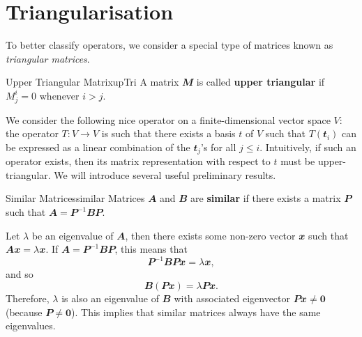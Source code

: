 \documentclass[math, code]{amznotes}
\theoremstyle{remark}
\newcommand{\zero}{\mathbf{0}}
\begin{document}
\section{Triangularisation}
To better classify operators, we consider a special type of matrices known as \textit{triangular matrices}.
\begin{dfnbox}{Upper Triangular Matrix}{upTri}
    A matrix $\mathbfit{M}$ is called {\color{red} \textbf{upper triangular}} if $M^i_j = 0$ whenever $i > j$.
\end{dfnbox}
We consider the following nice operator on a finite-dimensional vector space $V$: the operator $T \colon V \to V$ is such that there exists a basis $t$ of $V$ such that $T(\mathbfit{t}_i)$ can be expressed as a linear combination of the $\mathbfit{t}_j$'s for all $j \leq i$. Intuitively, if such an operator exists, then its matrix representation with respect to $t$ must be upper-triangular. We will introduce several useful preliminary results.
\begin{dfnbox}{Similar Matrices}{similar}
    Matrices $\mathbfit{A}$ and $\mathbfit{B}$ are {\color{red} \textbf{similar}} if there exists a matrix $\mathbfit{P}$ such that $\mathbfit{A} = \mathbfit{P}^{-1}\mathbfit{B}\mathbfit{P}$.
\end{dfnbox}
Let $\lambda$ be an eigenvalue of $\mathbfit{A}$, then there exists some non-zero vector $\mathbfit{x}$ such that $\mathbfit{Ax} = \lambda\mathbfit{x}$. If $\mathbfit{A} = \mathbfit{P}^{-1}\mathbfit{B}\mathbfit{P}$, this means that 
\begin{equation*}
    \mathbfit{P}^{-1}\mathbfit{B}\mathbfit{P}\mathbfit{x} = \lambda\mathbfit{x},
\end{equation*}
and so 
\begin{equation*}
    \mathbfit{B}(\mathbfit{Px}) = \lambda\mathbfit{Px}.
\end{equation*}
Therefore, $\lambda$ is also an eigenvalue of $\mathbfit{B}$ with associated eigenvector $\mathbfit{Px} \neq \zero$ (because $\mathbfit{P} \neq \zero$). This implies that similar matrices always have the same eigenvalues.
\end{document}
